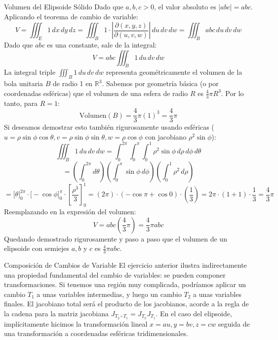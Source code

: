\documentclass[11pt,a4paper]{article}
\begin{document}
\begin{ejerciciobox}{Volumen del Elipsoide Sólido}
Dado que $a, b, c > 0$, el valor absoluto es $|abc| = abc$. Aplicando el teorema de cambio de variable:
\begin{equation*}
V = \iiint_E 1 \, dx \, dy \, dz = \iiint_B 1 \cdot \left| \frac{\partial(x,y,z)}{\partial(u,v,w)} \right| \, du \, dv \, dw = \iiint_B abc \, du \, dv \, dw
\end{equation*}
Dado que $abc$ es una constante, sale de la integral:
\begin{equation*}
V = abc \iiint_B 1 \, du \, dv \, dw
\end{equation*}
La integral triple $\iiint_B 1 \, du \, dv \, dw$ representa geométricamente el volumen de la bola unitaria $B$ de radio 1 en $\mathbb{R}^3$. Sabemos por geometría básica (o por coordenadas esféricas) que el volumen de una esfera de radio $R$ es $\frac{4}{3}\pi R^3$. Por lo tanto, para $R=1$:
\begin{equation*}
\text{Volumen}(B) = \frac{4}{3}\pi (1)^3 = \frac{4}{3}\pi
\end{equation*}
Si deseamos demostrar esto también rigurosamente usando esféricas ($u = \rho \sin\phi \cos\theta, v = \rho \sin\phi \sin\theta, w = \rho \cos\phi$ con jacobiano $\rho^2 \sin\phi$):
\begin{equation*}
\iiint_B 1 \, du \, dv \, dw = \int_0^{2\pi} \int_0^\pi \int_0^1 \rho^2 \sin\phi \, d\rho \, d\phi \, d\theta
\end{equation*}
\begin{equation*}
= \left( \int_0^{2\pi} d\theta \right) \left( \int_0^\pi \sin\phi \, d\phi \right) \left( \int_0^1 \rho^2 \, d\rho \right)
\end{equation*}
\begin{equation*}
= \Big[ \theta \Big]_0^{2\pi} \cdot \Big[ -\cos\phi \Big]_0^\pi \cdot \left[ \frac{\rho^3}{3} \right]_0^1 = (2\pi) \cdot (-\cos\pi + \cos 0) \cdot \left(\frac{1}{3}\right) = 2\pi \cdot (1+1) \cdot \frac{1}{3} = \frac{4}{3}\pi
\end{equation*}
Reemplazando en la expresión del volumen:
\begin{equation*}
V = abc \left( \frac{4}{3}\pi \right) = \frac{4}{3}\pi abc
\end{equation*}
Quedando demostrado rigurosamente y paso a paso que el volumen de un elipsoide con semiejes $a, b$ y $c$ es $\frac{4}{3}\pi abc$.
\end{ejerciciobox}

\begin{observacionbox}{Composición de Cambios de Variable}
El ejercicio anterior ilustra indirectamente una propiedad fundamental del cambio de variables: se pueden componer transformaciones. Si tenemos una región muy complicada, podríamos aplicar un cambio $T_1$ a unas variables intermedias, y luego un cambio $T_2$ a unas variables finales. El jacobiano total será el producto de los jacobianos, acorde a la regla de la cadena para la matriz jacobiana $J_{T_2 \circ T_1} = J_{T_2} J_{T_1}$.
En el caso del elipsoide, implícitamente hicimos la transformación lineal $x=au, y=bv, z=cw$ seguida de una transformación a coordenadas esféricas tridimensionales.
\end{observacionbox}
\end{document}
